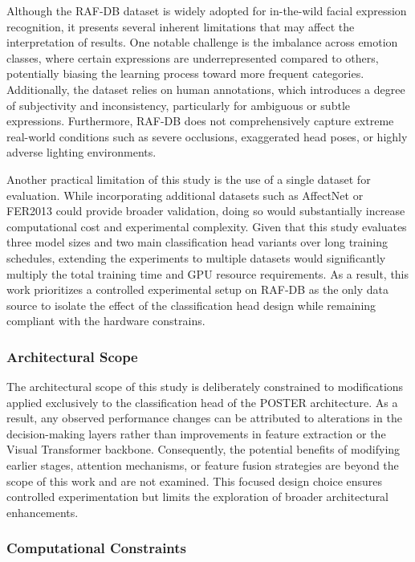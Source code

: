 Although the RAF-DB dataset is widely adopted for \gls{in-the-wild} facial expression recognition, it presents several inherent limitations that may affect the interpretation of results. One notable challenge is the imbalance across emotion classes, where certain expressions are underrepresented compared to others, potentially biasing the learning process toward more frequent categories. Additionally, the dataset relies on human annotations, which introduces a degree of subjectivity and inconsistency, particularly for ambiguous or subtle expressions. Furthermore, RAF-DB does not comprehensively capture extreme real-world conditions such as severe occlusions, exaggerated head poses, or highly adverse lighting environments. 

Another practical limitation of this study is the use of a single dataset for evaluation. While incorporating additional datasets such as AffectNet \cite{mollahosseini_affectnet_2019} or FER2013 \cite{khaireddin_facial_2021} could provide broader validation, doing so would substantially increase computational cost and experimental complexity. Given that this study evaluates three model sizes and two main classification head variants over long training schedules, extending the experiments to multiple datasets would significantly multiply the total training time and GPU resource requirements. As a result, this work prioritizes a controlled experimental setup on RAF‑DB as the only data source to isolate the effect of the classification head design while remaining compliant with the hardware constrains. 


\subsubsection{Architectural Scope}

The architectural scope of this study is deliberately constrained to modifications applied 
exclusively to the classification head of the \gls{POSTER} architecture. As a result, any observed performance changes can be attributed to alterations in the decision-making layers rather than improvements in feature extraction or the Visual Transformer backbone. Consequently, the potential benefits of modifying earlier stages, attention mechanisms, or feature fusion strategies are beyond the scope of this work and are not examined. This focused design choice ensures controlled experimentation but limits the exploration of broader architectural enhancements.

\subsubsection{Computational Constraints}

